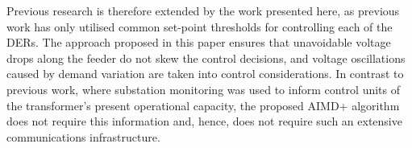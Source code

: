 Previous research is therefore extended by the work presented here, as previous work has only utilised common set-point thresholds for controlling each of the DERs. The approach proposed in this paper ensures that unavoidable voltage drops along the feeder do not skew the control decisions, and voltage oscillations caused by demand variation are taken into control considerations. In contrast to previous work, where substation monitoring was used to inform control units of the transformer's present operational capacity, the proposed AIMD+ algorithm does not require this information and, hence, does not require such an extensive communications infrastructure.